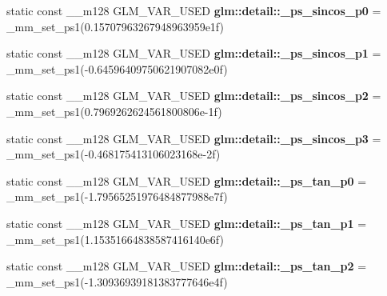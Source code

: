\begin{DoxyCompactItemize}
\item 
\hypertarget{namespaceglm_1_1detail_a75eec897d8abf8052d2901c18f8f37d3}{}static const \+\_\+\+\_\+m128 G\+L\+M\+\_\+\+V\+A\+R\+\_\+\+U\+S\+E\+D {\bfseries glm\+::detail\+::\+\_\+ps\+\_\+sincos\+\_\+p0} = \+\_\+mm\+\_\+set\+\_\+ps1(0.\+15707963267948963959e1f)\label{namespaceglm_1_1detail_a75eec897d8abf8052d2901c18f8f37d3}

\item 
\hypertarget{namespaceglm_1_1detail_a8dd72c0c14597e7d8fda30a992d06c73}{}static const \+\_\+\+\_\+m128 G\+L\+M\+\_\+\+V\+A\+R\+\_\+\+U\+S\+E\+D {\bfseries glm\+::detail\+::\+\_\+ps\+\_\+sincos\+\_\+p1} = \+\_\+mm\+\_\+set\+\_\+ps1(-\/0.\+64596409750621907082e0f)\label{namespaceglm_1_1detail_a8dd72c0c14597e7d8fda30a992d06c73}

\item 
\hypertarget{namespaceglm_1_1detail_a02f0e4b6915800a1f8bcbc28b7c00143}{}static const \+\_\+\+\_\+m128 G\+L\+M\+\_\+\+V\+A\+R\+\_\+\+U\+S\+E\+D {\bfseries glm\+::detail\+::\+\_\+ps\+\_\+sincos\+\_\+p2} = \+\_\+mm\+\_\+set\+\_\+ps1(0.\+7969262624561800806e-\/1f)\label{namespaceglm_1_1detail_a02f0e4b6915800a1f8bcbc28b7c00143}

\item 
\hypertarget{namespaceglm_1_1detail_a535996c10bfaa0fd8b91a123f6656f31}{}static const \+\_\+\+\_\+m128 G\+L\+M\+\_\+\+V\+A\+R\+\_\+\+U\+S\+E\+D {\bfseries glm\+::detail\+::\+\_\+ps\+\_\+sincos\+\_\+p3} = \+\_\+mm\+\_\+set\+\_\+ps1(-\/0.\+468175413106023168e-\/2f)\label{namespaceglm_1_1detail_a535996c10bfaa0fd8b91a123f6656f31}

\item 
\hypertarget{namespaceglm_1_1detail_ab96e54d865bccd19b24a614b7ee7329c}{}static const \+\_\+\+\_\+m128 G\+L\+M\+\_\+\+V\+A\+R\+\_\+\+U\+S\+E\+D {\bfseries glm\+::detail\+::\+\_\+ps\+\_\+tan\+\_\+p0} = \+\_\+mm\+\_\+set\+\_\+ps1(-\/1.\+79565251976484877988e7f)\label{namespaceglm_1_1detail_ab96e54d865bccd19b24a614b7ee7329c}

\item 
\hypertarget{namespaceglm_1_1detail_a241c113d683c1bba586cf1cd1c0d7803}{}static const \+\_\+\+\_\+m128 G\+L\+M\+\_\+\+V\+A\+R\+\_\+\+U\+S\+E\+D {\bfseries glm\+::detail\+::\+\_\+ps\+\_\+tan\+\_\+p1} = \+\_\+mm\+\_\+set\+\_\+ps1(1.\+15351664838587416140e6f)\label{namespaceglm_1_1detail_a241c113d683c1bba586cf1cd1c0d7803}

\item 
\hypertarget{namespaceglm_1_1detail_a69e2a403c6d01bf40ee290e53df91467}{}static const \+\_\+\+\_\+m128 G\+L\+M\+\_\+\+V\+A\+R\+\_\+\+U\+S\+E\+D {\bfseries glm\+::detail\+::\+\_\+ps\+\_\+tan\+\_\+p2} = \+\_\+mm\+\_\+set\+\_\+ps1(-\/1.\+30936939181383777646e4f)\label{namespaceglm_1_1detail_a69e2a403c6d01bf40ee290e53df91467}


\end{DoxyCompactItemize}
